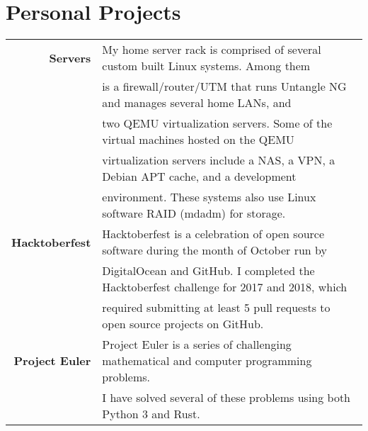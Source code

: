 \documentclass[letterpaper,10pt]{article}
\begin{document}
    \section*{Personal Projects}
        \vspace*{1ex}
        \begin{tabular}{rl}
            \textbf{Servers} & My home server rack is comprised of several custom built Linux systems. Among them \\
                             & is a firewall/router/UTM that runs Untangle NG and manages several home LANs, and \\
                             & two QEMU virtualization servers. Some of the virtual machines hosted on the QEMU \\
                             & virtualization servers include a NAS, a VPN, a Debian APT cache, and a development \\
                             & environment. These systems also use Linux software RAID (mdadm) for storage. \\[1ex]
            \textbf{Hacktoberfest} & Hacktoberfest is a celebration of open source software during the month of October run by \\
                                   & DigitalOcean and GitHub. I completed the Hacktoberfest challenge for 2017 and 2018, which \\
                                   & required submitting at least 5 pull requests to open source projects on GitHub. \\[1ex]
            \textbf{Project Euler} & Project Euler is a series of challenging mathematical and computer programming problems. \\
                                   & I have solved several of these problems using both Python 3 and Rust. \\[1ex]
        \end{tabular}
\end{document}
